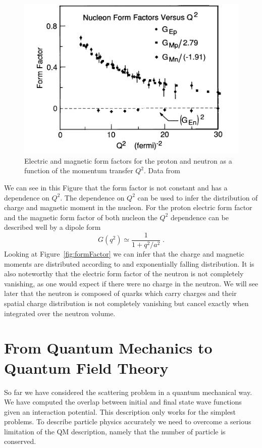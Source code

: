 \documentclass[12pt]{article}
\begin{document}
\begin{figure}
\begin{center}
\includegraphics[scale=0.4]{images/FormFactorOfQ2.png}
\end{center}
\caption{Electric and magnetic form factors for the proton and neutron as a function of the momentum transfer $Q^2$. Data from \cite{Hughes:1966zz}}\label{fig:FormFactorOfQ2}
\end{figure}
We can see in this Figure that the form factor is not constant and has a dependence on $Q^2$. The dependence on $Q^2$ can be used to infer the distribution of charge and magnetic moment in the nucleon. For the proton electric form factor and the magnetic form factor of both nucleon the $Q^2$ dependence can be described well by a dipole form
\[G(q^2)\simeq\frac{1}{1+q^2/a^2}\;.\]
Looking at Figure~\ref{fig:formFactor} we can infer that the charge and magnetic moments are distributed according to and exponentially falling distribution. It is also noteworthy that the electric form factor of the neutron is not completely vanishing, as one would expect if there were no charge in the neutron. We will see later that the neutron is composed of quarks which carry charges and their spatial charge distribution is not completely vanishing but cancel exactly when integrated over the neutron volume. 

\section{From Quantum Mechanics to Quantum Field Theory}
So far we have considered the scattering problem in a quantum mechanical way. We have computed the overlap between initial and final state wave functions given an interaction potential. This description only works for the simplest problems. To describe particle physics accurately we need to overcome a serious limitation of the QM description, namely that the number of particle is conserved. 
\end{document}
